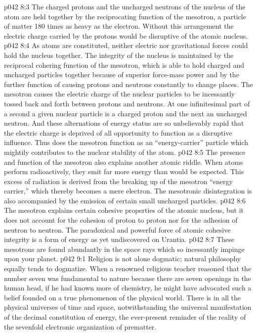 \pc \vs p042 8:3 The charged protons and the uncharged neutrons of the nucleus of the atom are held together by the reciprocating function of the mesotron, a particle of matter 180 times as heavy as the electron. Without this arrangement the electric charge carried by the protons would be disruptive of the atomic nucleus.
\vs p042 8:4 As atoms are constituted, neither electric nor gravitational forces could hold the nucleus together. The integrity of the nucleus is maintained by the reciprocal cohering function of the mesotron, which is able to hold charged and uncharged particles together because of superior force\hyp{}mass power and by the further function of causing protons and neutrons constantly to change places. The mesotron causes the electric charge of the nuclear particles to be incessantly tossed back and forth between protons and neutrons. At one infinitesimal part of a second a given nuclear particle is a charged proton and the next an uncharged neutron. And these alternations of energy status are so unbelievably rapid that the electric charge is deprived of all opportunity to function as a disruptive influence. Thus does the mesotron function as an “energy\hyp{}carrier” particle which mightily contributes to the nuclear stability of the atom.
\vs p042 8:5 The presence and function of the mesotron also explains another atomic riddle. When atoms perform radioactively, they emit far more energy than would be expected. This excess of radiation is derived from the breaking up of the mesotron “energy carrier,” which thereby becomes a mere electron. The mesotronic disintegration is also accompanied by the emission of certain small uncharged particles.\plusone
\vs p042 8:6 The mesotron explains certain cohesive properties of the atomic nucleus, but it does not account for the cohesion of proton to proton nor for the adhesion of neutron to neutron. The paradoxical and powerful force of atomic cohesive integrity is a form of energy as yet undiscovered on Urantia.
\vs p042 8:7 These mesotrons are found abundantly in the space rays which so incessantly impinge upon your planet.
\vs p042 9:1 Religion is not alone dogmatic; natural philosophy equally tends to dogmatize. When a renowned religious teacher reasoned that the number seven was fundamental to nature because there are seven openings in the human head, if he had known more of chemistry, he might have advocated such a belief founded on a true phenomenon of the physical world. There is in all the physical universes of time and space, notwithstanding the universal manifestation of the decimal constitution of energy, the ever\hyp{}present reminder of the reality of the sevenfold electronic organization of prematter.
